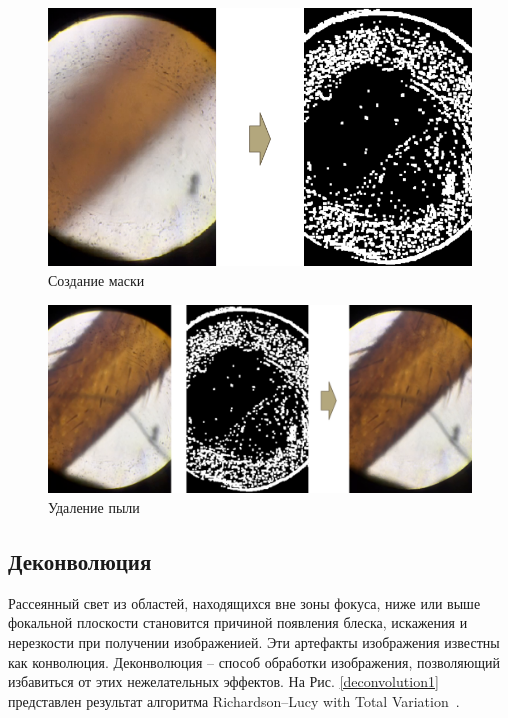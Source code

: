 \documentclass[14pt]{matmex-diploma-custom}
\begin{document}
\begin{figure}[h]
\centering
\includegraphics[width=1.0\textwidth]{figures/dust1.png}
\caption{Создание маски}
\label{dust_map1}
\end{figure}

\newpage

\begin{figure}[h]
\centering
\includegraphics[width=1.0\textwidth]{figures/dust2.png}
\caption{Удаление пыли}
\label{dust_filtering1}
\end{figure}


\subsection{Деконволюция}
Рассеянный свет из областей, находящихся вне зоны фокуса, ниже или выше фокальной плоскости становится причиной появления блеска, искажения и нерезкости при получении изображенией. Эти артефакты изображения известны как конволюция. Деконволюция – способ обработки изображения, позволяющий избавиться от этих нежелательных эффектов. На Рис. \ref{deconvolution1} представлен результат алгоритма Richardson–Lucy with Total Variation~\cite{RLTV}.
\end{document}
